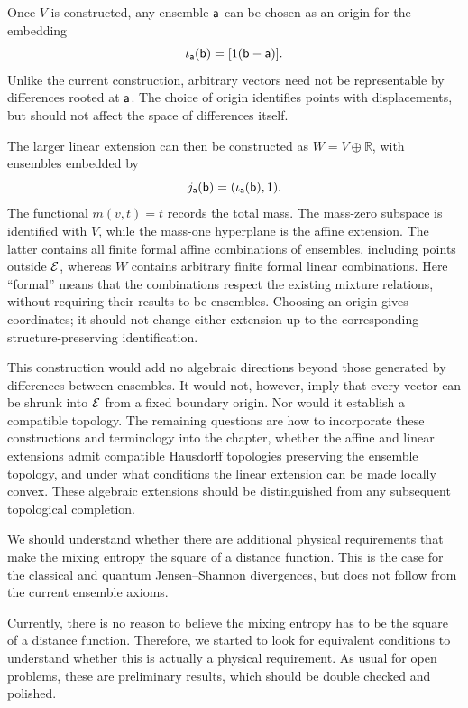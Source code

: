Once $V$ is constructed, any ensemble $\ens[a]$ can be chosen as an origin for the embedding
\[
\iota_{\ens[a]}(\ens[b])=[1(\ens[b]-\ens[a])].
\]
Unlike the current construction, arbitrary vectors need not be representable by differences rooted at $\ens[a]$. The choice of origin identifies points with displacements, but should not affect the space of differences itself.

The larger linear extension can then be constructed as $W=V\oplus\mathbb{R}$, with ensembles embedded by
\[
j_{\ens[a]}(\ens[b])=(\iota_{\ens[a]}(\ens[b]),1).
\]
The functional $m(v,t)=t$ records the total mass. The mass-zero subspace is identified with $V$, while the mass-one hyperplane is the affine extension. The latter contains all finite formal affine combinations of ensembles, including points outside $\Ens$, whereas $W$ contains arbitrary finite formal linear combinations. Here ``formal'' means that the combinations respect the existing mixture relations, without requiring their results to be ensembles. Choosing an origin gives coordinates; it should not change either extension up to the corresponding structure-preserving identification.

This construction would add no algebraic directions beyond those generated by differences between ensembles. It would not, however, imply that every vector can be shrunk into $\Ens$ from a fixed boundary origin. Nor would it establish a compatible topology. The remaining questions are how to incorporate these constructions and terminology into the chapter, whether the affine and linear extensions admit compatible Hausdorff topologies preserving the ensemble topology, and under what conditions the linear extension can be made locally convex. These algebraic extensions should be distinguished from any subsequent topological completion.

{We should understand whether there are additional physical requirements that make the mixing entropy the square of a distance function. This is the case for the classical and quantum Jensen--Shannon divergences, but does not follow from the current ensemble axioms.}

Currently, there is no reason to believe the mixing entropy has to be the square of a distance function. Therefore, we started to look for equivalent conditions to understand whether this is actually a physical requirement. As usual for open problems, these are preliminary results, which should be double checked and polished.

